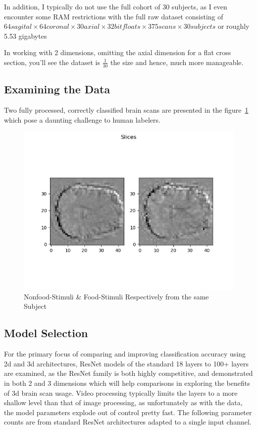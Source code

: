 \documentclass[10pt,twocolumn,letterpaper]{article}
\begin{document}
In addition, I typically do not use the full cohort of 30 subjects, as I even encounter some RAM restrictions with the
full raw dataset consisting of
$64 sagital \times 64 coronal \times 30 axial \times 32bit floats \times 375 scans \times 30 subjects$ or roughly 5.53 gigabytes

In working with 2 dimensions, omitting the axial dimension for a flat cross section, you'll see the dataset is
$\frac{1}{30}$ the size and hence, much more manageable.


\subsection{Examining the Data}\label{subsec:examining-data}

Two fully processed, correctly classified brain scans are presented in the figure~\ref{fig:comparison}
which pose a daunting challenge to human labelers.

\begin{figure}
  \includegraphics[width=\linewidth]{images/nf_f_hard_comparison.png}
  \caption{Nonfood-Stimuli \& Food-Stimuli Respectively from the same Subject}
  \label{fig:comparison}
\end{figure}

\subsection{Model Selection}\label{subsec:model-selection}

For the primary focus of comparing and improving classification accuracy using 2d and 3d architectures, ResNet models
of the standard 18 layers to 100+ layers are examined, as the ResNet family is both highly competitive, and demonstrated
in both 2 and 3 dimensions which will help comparisons in exploring the benefits of 3d brain scan usage.
Video processing typically limits the layers to a more shallow level than that of image processing, as unfortunately as
with the data, the model parameters explode out of control pretty fast.
The following parameter counts are from standard ResNet architectures adapted to a single input channel.
\end{document}
